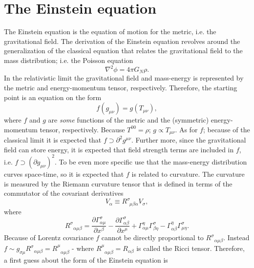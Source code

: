 \section{The Einstein equation}
The Einstein equation is the equation of motion for the metric, i.e. the gravitational field. The derivation of the Einstein equation revolves around the generalization of the classical equation that relates the gravitational field to the mass distribution; i.e. the Poisson equation
\begin{equation}
	\nabla^2\phi=4\pi G_N\rho.
\end{equation} 
In the relativistic limit the gravitational field and mass-energy is represented by the metric and energy-momentum tensor, respectively. Therefore, the starting point is an equation on the form
\begin{equation}
	f(g_{\mu\nu})=g(T_{\mu\nu}),
\end{equation} 
where $f$ and $g$ are \emph{some} functions of the metric and the (symmetric) energy-momentum tensor, respectively. Because $T^{00}=\rho$; $g\propto T_{\mu\nu}$. As for $f$; because of the classical limit it is expected that $f\supset \partial^2g^{\mu\nu}$. Further more, since the gravitational field can store energy, it is expected that field strength terms are included in $f$, i.e. $f\supset (\partial g_{\mu\nu})^2$. To be even more specific use that the mass-energy distribution curves space-time, so it is expected that $f$ is related to curvature. The curvature is measured by the Riemann curvature tensor that is defined in terms of the commutator of the covariant derivatives
\begin{equation}
	[D_\mu,D_\nu]V_\alpha\equiv R^\sigma_{\,\,\,\mu\beta\alpha}V_\sigma,
\end{equation} 
where
\begin{equation}
	R^{\sigma}_{\,\,\,\, \alpha \mu\beta}=\frac{\partial \Gamma^{\sigma}_{\alpha\mu}}{\partial x^{\beta}}-\frac{\partial \Gamma^{\sigma}_{\alpha\beta}}{\partial x^{\mu}}+\Gamma^{\eta}_{\alpha\mu}\Gamma^{\sigma}_{\beta\eta}-\Gamma^{\eta}_{\alpha\beta}\Gamma^{\sigma}_{\mu\eta}.
\end{equation} 
Because of Lorentz covariance $f$ cannot be directly proportional to $R^{\sigma}_{\,\,\,\, \alpha \mu\beta}$. Instead $f\sim g_{\sigma\mu}R^{\sigma}_{\,\,\,\, \alpha \mu\beta}=R^{\mu}_{\,\,\,\, \alpha \mu\beta}$ - where $R^{\mu}_{\,\,\,\, \alpha \mu\beta}=R_{\alpha\beta}$ is called the Ricci tensor. Therefore, a first guess about the form of the Einstein equation is
